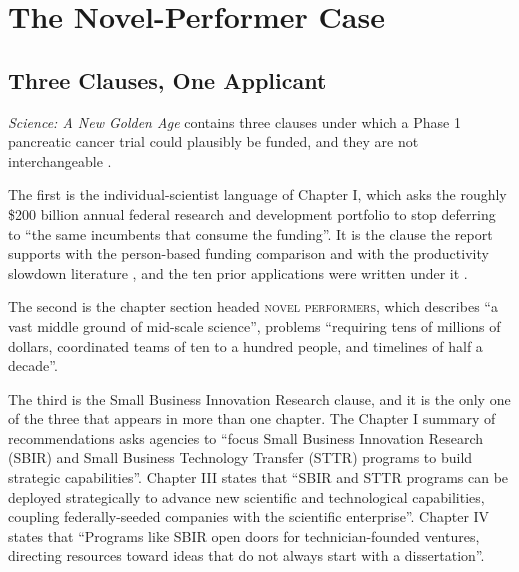 \section{The Novel-Performer Case}

\subsection{Three Clauses, One Applicant}

\emph{Science: A New Golden Age} contains three clauses under which a Phase 1
pancreatic cancer trial could plausibly be funded, and they are not
interchangeable \cite{kratsios2026sciencegoldenage}.

The first is the individual-scientist language of Chapter I, which asks the
roughly \$200 billion annual federal research and development portfolio to stop
deferring to ``the same incumbents that consume the funding''. It is the clause
the report supports with the person-based funding comparison and with the
productivity slowdown literature \cite{azoulay2011incentives,scannell2012eroom},
and the ten prior applications were written under it \cite{tenapps2026}.

The second is the chapter section headed \textsc{novel performers}, which
describes ``a vast middle ground of mid-scale science'', problems ``requiring
tens of millions of dollars, coordinated teams of ten to a hundred people, and
timelines of half a decade''.

The third is the Small Business Innovation Research clause, and it is the only
one of the three that appears in more than one chapter. The Chapter I summary of
recommendations asks agencies to ``focus Small Business Innovation Research
(SBIR) and Small Business Technology Transfer (STTR) programs to build strategic
capabilities''. Chapter III states that ``SBIR and STTR programs can be deployed
strategically to advance new scientific and technological capabilities, coupling
federally-seeded companies with the scientific enterprise''. Chapter IV states
that ``Programs like SBIR open doors for technician-founded ventures, directing
resources toward ideas that do not always start with a dissertation''.

